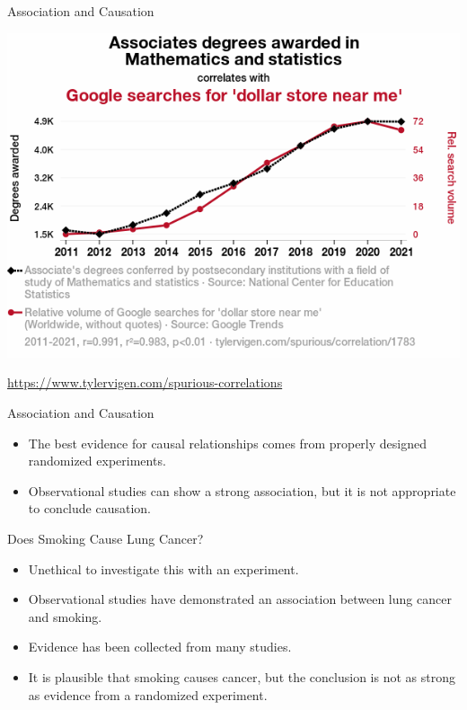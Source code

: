 \documentclass[handout]{beamer}
\begin{document}
\begin{frame}{Association and Causation}
    \begin{center}
        \includegraphics[width=.8\linewidth]{figures/1783_associates-degrees-awarded-in-mathematics-and-statistics_correlates-with_google-searches-for-dollar-store-near-me.png}
    \end{center}
    \footnotesize 
    \href{https://www.tylervigen.com/spurious-correlations}{https://www.tylervigen.com/spurious-correlations}
\end{frame}

\begin{frame}{Association and Causation}
    \begin{itemize}
        \item The best evidence for causal relationships comes from properly designed randomized experiments. 
        \item Observational studies can show a strong association, but it is not appropriate to conclude causation.
    \end{itemize}
\end{frame}

\begin{frame}{Does Smoking Cause Lung Cancer?}
    \begin{itemize}
        \item Unethical to investigate this with an experiment.
        \item Observational studies have demonstrated an association between lung cancer and smoking.
        \item Evidence has been collected from many studies.
        \item It is plausible that smoking causes cancer, but the conclusion is not as strong as evidence from a randomized experiment. 
    \end{itemize}
\end{frame}
\end{document}
